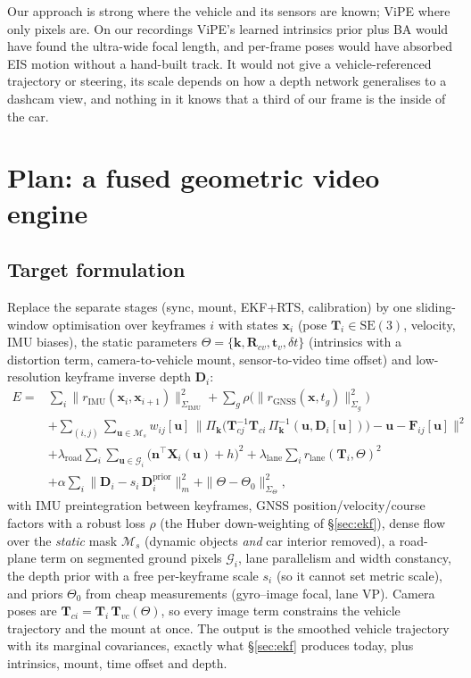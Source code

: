 \documentclass[10pt,a4paper]{article}
\newcommand{\x}{\bm{x}}
\begin{document}
\noindent Our approach is strong where the vehicle and its sensors are known; ViPE where only pixels are. On
our recordings ViPE's learned intrinsics prior plus BA would have found the ultra-wide focal length, and
per-frame poses would have absorbed EIS motion without a hand-built track. It would not give a
vehicle-referenced trajectory or steering, its scale depends on how a depth network generalises to a
dashcam view, and nothing in it knows that a third of our frame is the inside of the car.

\section{Plan: a fused geometric video engine}
\label{sec:plan}

\subsection{Target formulation}
Replace the separate stages (sync, mount, EKF+RTS, calibration) by one sliding-window optimisation over
keyframes $i$ with states $\x_i$ (pose $\mathbf T_i\in\mathrm{SE}(3)$, velocity, IMU biases), the static
parameters $\Theta = \{\bm k, \mathbf R_{cv}, \bm t_v, \delta t\}$ (intrinsics with a distortion term,
camera-to-vehicle mount, sensor-to-video time offset) and low-resolution keyframe inverse depth $\mathbf D_i$:
\begin{equation}
\begin{aligned}
E = {}& \sum_i \|r_\text{IMU}(\x_i, \x_{i+1})\|^2_{\Sigma_\text{IMU}}
 + \sum_g \rho\big(\|r_\text{GNSS}(\x, t_g)\|^2_{\Sigma_g}\big)
 \\
 &+ \sum_{(i,j)} \sum_{\bm u\in\mathcal M_s} w_{ij}[\bm u]\,\big\|\Pi_{\bm k}\big(\mathbf T_{cj}^{-1}\mathbf T_{ci}\,\Pi_{\bm k}^{-1}(\bm u, \mathbf D_i[\bm u])\big) - \bm u - \mathbf F_{ij}[\bm u]\big\|^2 \\
 &+ \lambda_\text{road}\sum_i\sum_{\bm u\in\mathcal G_i} \big(\bm n^\top \mathbf X_i(\bm u) + h\big)^2
 + \lambda_\text{lane}\sum_i r_\text{lane}(\mathbf T_i, \Theta)^2 \\
 &+ \alpha\sum_i \|\mathbf D_i - s_i\,\mathbf D_i^\text{prior}\|^2_{m}
 + \|\Theta - \Theta_0\|^2_{\Sigma_\Theta},
\end{aligned}
\end{equation}
with IMU preintegration between keyframes, GNSS position/velocity/course factors with a robust loss $\rho$
(the Huber down-weighting of \S\ref{sec:ekf}), dense flow over the \emph{static} mask $\mathcal M_s$ (dynamic
objects \emph{and} car interior removed), a road-plane term on segmented ground pixels $\mathcal G_i$, lane
parallelism and width constancy, the depth prior with a free per-keyframe scale $s_i$ (so it cannot set
metric scale), and priors $\Theta_0$ from cheap measurements (gyro--image focal, lane VP). Camera poses are
$\mathbf T_{ci} = \mathbf T_i\,\mathbf T_{vc}(\Theta)$, so every image term constrains the vehicle trajectory
and the mount at once. The output is the smoothed vehicle trajectory with its marginal covariances, exactly
what \S\ref{sec:ekf} produces today, plus intrinsics, mount, time offset and depth.
\end{document}
